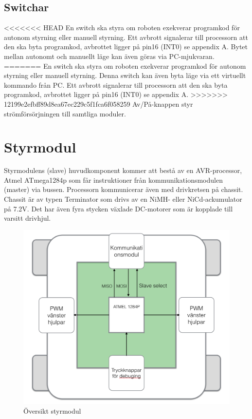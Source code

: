 \documentclass[a4paper,12pt,fleqn]{article}
\begin{document}
\subsection{Switchar}
<<<<<<< HEAD
En switch ska styra om roboten exekverar programkod för autonom styrning eller manuell styrning. Ett avbrott signalerar till processorn att den ska byta programkod, avbrottet ligger på pin16 (INT0) se appendix A. 
Bytet mellan autonomt och manuellt läge kan även göras via PC-mjukvaran.
=======
En switch ska styra om roboten exekverar programkod för autonom styrning eller manuell styrning. Denna switch kan även byta läge via ett virtuellt kommando från PC. Ett avbrott signalerar till processorn att den ska byta programkod, avbrottet ligger på pin16 (INT0) se appendix A. 
>>>>>>> 12199e2efbff89d8ea67ec229c5f1fca6f058259
Av/På-knappen styr strömförsörjningen till samtliga moduler. 


\newpage
\section{Styrmodul}
Styrmodulens (slave) huvudkomponent kommer att bestå av en AVR-processor, Atmel ATmega1284p som får instruktioner från kommunikationsmodulen (master) via bussen. Processorn kommunicerar även med drivkretsen på chassit. Chassit är av typen Terminator som drivs av en NiMH- eller NiCd-ackumulator på 7.2V. Det har även fyra stycken växlade DC-motorer som är kopplade till varsitt drivhjul. 

\begin{figure}[htp] %
  \begin{center}
  \includegraphics[keepaspectratio=true,scale=0.5]{bilder/styrmodul}  %
  \end{center}
  \caption{Översikt styrmodul} %
  \label{fig:styr} %
\end{figure}
\newpage
\end{document}
